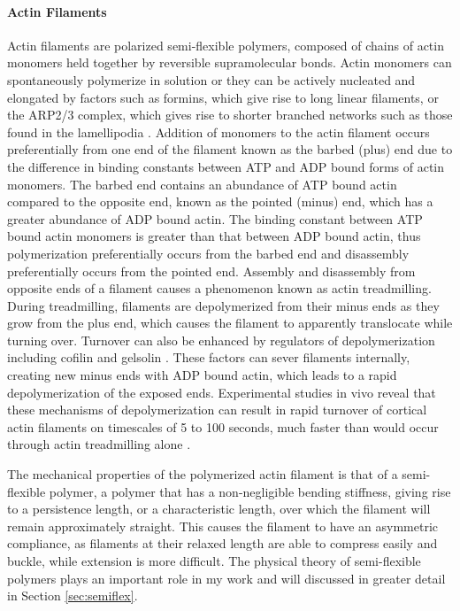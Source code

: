\paragraph{Actin Filaments} Actin filaments are polarized semi-flexible polymers, composed of chains of actin monomers held together by reversible supramolecular bonds.  Actin monomers can spontaneously polymerize in solution or they can be actively nucleated and elongated by factors such as formins, which give rise to long linear filaments, or the ARP2/3 complex, which gives rise to shorter branched networks such as those found in the lamellipodia \cite{Alberts}.  Addition of monomers to the actin filament occurs preferentially from one end of the filament known as the barbed (plus) end due to the difference in binding constants between ATP and ADP bound forms of actin monomers. The barbed end contains an abundance of ATP bound actin compared to the opposite end, known as the pointed (minus) end, which has a greater abundance of ADP bound actin. The binding constant between ATP bound actin monomers is greater than that between ADP bound actin, thus polymerization preferentially occurs from the barbed end and disassembly preferentially occurs from the pointed end.  Assembly and disassembly from opposite ends of a filament causes a phenomenon known as actin treadmilling. During treadmilling, filaments are depolymerized from their minus ends as they grow from the plus end, which causes the filament to apparently translocate while turning over.  Turnover can also be enhanced by regulators of depolymerization including cofilin and gelsolin \cite{bemenet}. These  factors can  sever filaments internally, creating new minus ends with ADP bound actin, which leads to a rapid depolymerization of the exposed ends.  Experimental studies in vivo  reveal that these mechanisms of depolymerization can result in rapid turnover of cortical actin filaments on timescales of 5 to 100 seconds, much faster than would occur through actin treadmilling alone \cite{Robin:2014aa, Fritzsche:2013aa, Fritzschee1501337, Carlsson:2010aa, Lai:2008aa}.   

The mechanical properties of the polymerized actin filament is that of a semi-flexible polymer,  a polymer that has a non-negligible bending stiffness, giving rise to a persistence length, or a characteristic length, over which the filament will  remain approximately straight.  This causes the filament to have an asymmetric compliance, as filaments at their relaxed length are able to compress easily and buckle, while extension is more difficult.  The physical theory of semi-flexible polymers plays an important role in my work and will discussed in greater detail in Section \ref{sec:semiflex}.

